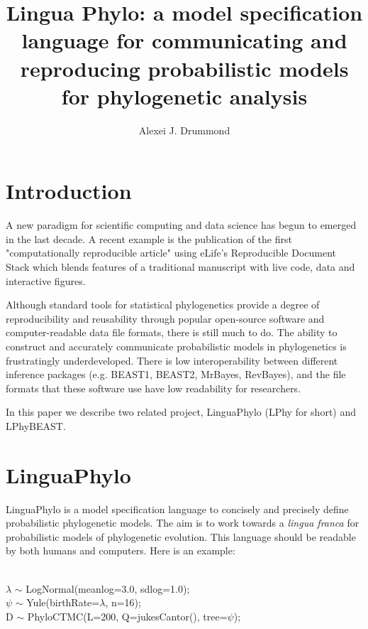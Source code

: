 \documentclass[11pt]{article}
\begin{document}
\title{Lingua Phylo: a model specification language for communicating and reproducing probabilistic models for phylogenetic analysis}
\author{Alexei J. Drummond}
\date{}
\maketitle


\section{Introduction}

A new paradigm for scientific computing and data science has begun to emerged in the last decade. A recent example is the publication of the first "computationally reproducible article" using eLife's Reproducible Document Stack which blends features of a traditional manuscript with live code, data and interactive figures.

Although standard tools for statistical phylogenetics provide a degree of reproducibility and reusability through popular open-source software and computer-readable data file formats, there is still much to do. The ability to construct and accurately communicate probabilistic models in phylogenetics is frustratingly underdeveloped. There is low interoperability between different inference packages (e.g. BEAST1, BEAST2, MrBayes, RevBayes), and the file formats that these software use have low readability for researchers.

In this paper we describe two related project, LinguaPhylo (LPhy for short) and LPhyBEAST. 

\section{ LinguaPhylo}

LinguaPhylo is a model specification language to concisely and precisely define probabilistic phylogenetic models. The aim is to work towards a {\it lingua franca} for probabilistic models of phylogenetic evolution. This language should be readable by both humans and computers. Here is an example:
\\\\
\begin{tt}
\noindent$\lambda$ $\sim$ LogNormal(meanlog=3.0, sdlog=1.0);\\
$\psi$ $\sim$ Yule(birthRate=$\lambda$, n=16);\\
D $\sim$ PhyloCTMC(L=200, Q=jukesCantor(), tree=$\psi$);\\
\end{tt}
\end{document}

